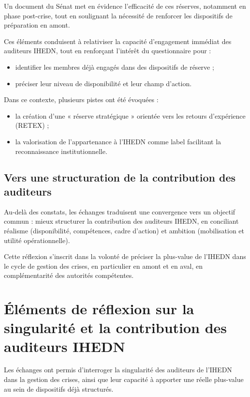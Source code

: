 \documentclass[12pt,a4paper]{article}
\begin{document}
Un document du Sénat met en évidence l'efficacité de ces réserves, notamment en phase post-crise, tout en soulignant la nécessité de renforcer les dispositifs de préparation en amont.

Ces éléments conduisent à relativiser la capacité d'engagement immédiat des auditeurs IHEDN, tout en renforçant l'intérêt du questionnaire pour :
\begin{itemize}
    \item identifier les membres déjà engagés dans des dispositifs de réserve ;
    \item préciser leur niveau de disponibilité et leur champ d'action.
\end{itemize}

Dans ce contexte, plusieurs pistes ont été évoquées :
\begin{itemize}
    \item la création d'une « réserve stratégique » orientée vers les retours d'expérience (RETEX) ;
    \item la valorisation de l'appartenance à l'IHEDN comme label facilitant la reconnaissance institutionnelle.
\end{itemize}

\subsection{Vers une structuration de la contribution des auditeurs}

Au-delà des constats, les échanges traduisent une convergence vers un objectif commun : mieux structurer la contribution des auditeurs IHEDN, en conciliant réalisme (disponibilité, compétences, cadre d'action) et ambition (mobilisation et utilité opérationnelle).

Cette réflexion s'inscrit dans la volonté de préciser la plus-value de l'IHEDN dans le cycle de gestion des crises, en particulier en amont et en aval, en complémentarité des autorités compétentes.

\section{Éléments de réflexion sur la singularité et la contribution des auditeurs IHEDN}

Les échanges ont permis d'interroger la singularité des auditeurs de l'IHEDN dans la gestion des crises, ainsi que leur capacité à apporter une réelle plus-value au sein de dispositifs déjà structurés.
\end{document}
